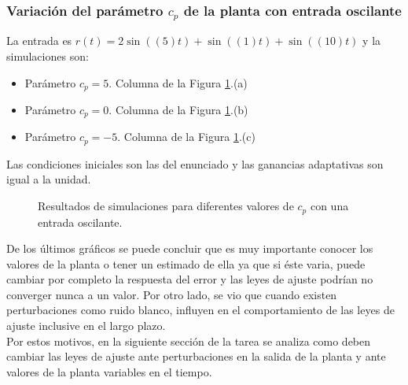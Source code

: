 \documentclass[letterpaper,11pt]{article} %
\begin{document}
\subsubsection{Variación del parámetro $c_p$ de la planta con entrada oscilante}
La entrada es $r(t) = 2\sin((5)t) + \sin((1)t) + \sin((10)t)$ y la simulaciones son:
\begin{itemize}
	\item Parámetro $c_p = 5$. Columna de la Figura \ref{parametrocO}.(a)
	\item Parámetro $c_p = 0$. Columna de la Figura \ref{parametrocO}.(b)
	\item Parámetro $c_p = -5$. Columna de la Figura \ref{parametrocO}.(c)
\end{itemize}
Las condiciones iniciales son las del enunciado y las ganancias adaptativas son igual a la unidad.
\newpage
\begin{figure}[h]
	\centering
	\captionsetup{justification=centering}
	\newline
	\noindent
	\newline
	\noindent
	\addtocounter{figure}{-1}  
	\caption{Resultados de simulaciones para diferentes valores de $c_p$ con una entrada oscilante.}
	\label{parametrocO}
\end{figure}

De los últimos gráficos se puede concluir que es muy importante conocer los valores de la planta o tener un estimado de ella ya que si éste varia, puede cambiar por completo la respuesta del error y las leyes de ajuste podrían no converger nunca a un valor. Por otro lado, se vio que cuando existen perturbaciones como ruido blanco, influyen en el comportamiento de las leyes de ajuste inclusive en el largo plazo.\\
Por estos motivos, en la siguiente sección de la tarea se analiza como deben cambiar las leyes de ajuste ante perturbaciones en la salida de la planta y ante valores de la planta variables en el tiempo.

\newpage
\end{document}
